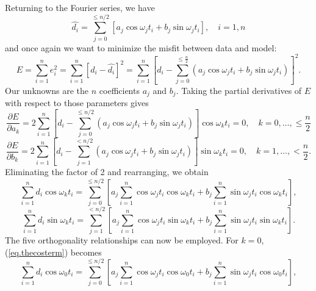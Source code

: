 Returning to the Fourier series, we have
\begin{equation}
\hat{d_i} = \sum^{ \leq n/2}_{j=0}\left[ a_{j} \cos \omega_{j}t_{i} + b_{j} \sin \omega_{j}t_{i}\right],\quad i = 1,n
\label{eq:fourierseries}
\end{equation}
and once again we want to minimize the misfit between data and model:
 \begin{equation}
E=\sum^{n}_{i=1}e^2_i = \sum^{n}_{i=1}\left[ d_i - \hat{d_i}\right]^2 = \sum^{n}_{i=1}\left[ d_{i}-\sum^{\leq \frac{n}{2}}_{j=0}\left( a_{j} \cos \omega_{j}t_{i} + b_{j} \sin \omega_{j}t_{i}\right)\right]^2.
\end{equation}
Our unknowns are the $n$ coefficients $a_j$ and $b_j$.  Taking the partial derivatives of $E$ with respect to those parameters gives
\begin{equation}
\frac{\partial E}{\partial a_{k}}=2 \sum^{n}_{i=1}\left[d_{i}-\sum^{ \leq n/2}_{j=0} \left(a_{j} \cos \omega_{j} t_{i} + b_{j} \sin \omega_{j} t_{i}\right) \right] \cos \omega_{k} t_{i} = 0, \quad k =0, \dots, \leq \frac{n}{2}
\end{equation}
\begin{equation}
\frac{\partial E}{\partial b_{k}} = 2 \sum^{n}_{i=1}\left[ d_{i}-\sum^{< n/2}_{j=1} \left( a_{j} \cos \omega_{j} t_{i} + b_{j} \sin \omega_{j} t_{i}\right) \right] \sin \omega_{k} t_{i} =0, \quad k = 1, \dots, < \frac{n}{2}.
\end{equation}
Eliminating the factor of 2 and rearranging, we obtain
\begin{equation}
\sum^{n}_{i=1}d_{i} \cos \omega_{k} t_{i} = \sum^{\leq n/2}_{j=0}\left[ a_{j}\sum^{n}_{i=1} \cos \omega_{j} t_{i} \cos \omega_{k} t_i + b_{j} \sum^{n}_{i=1} \sin \omega_{j} t_{i}\cos \omega_{k} t_i \right ],
\label{eq.thecosterm}
\end{equation}
\begin{equation}
\sum^{n}_{i=1}d_{i} \sin \omega_{k}t_{i} = \sum^{< n/2}_{j=1}\left[ a_{j}\sum^{n}_{i=1} \cos \omega_{j}t_{i} \sin \omega_{k}t_{i} + b_{j}\sum^{n}_{i=1} \sin \omega_{j}t_{i} \sin \omega_{k}t_{i} \right] .
\label{eq:dft_n2}
\end{equation}
The  five orthogonality relationships can now be employed.  For $k = 0$, (\ref{eq.thecosterm}) becomes
\begin{equation}
\sum^{n}_{i=1}d_{i}\cos \omega_{0}t_{i} = \sum^{\leq n/2}_{j=0}\left[a_{j} \sum^{n}_{i=1} \cos \omega_{j}t_{i} \cos \omega_{0} t_{i} +b_{j} \sum^{n}_{i=1} \sin \omega_{j}t_{i} \cos \omega_{0}t_{i} \right],
\end{equation}
